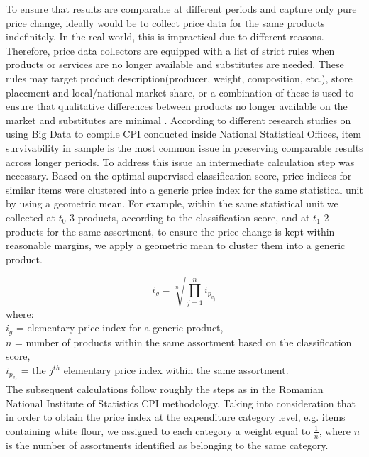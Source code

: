 \documentclass[]{article}
\begin{document}
To ensure that results are comparable at different periods and capture only pure price change, ideally would be to collect price data for the same products indefinitely\cite{cpi2}. In the real world, this is impractical due to different reasons. Therefore, price data collectors are equipped with a list of strict rules when products or services are no longer available and substitutes are needed. These rules may target product description(producer, weight, composition, etc.), store placement and local/national market share, or a combination of these is used to ensure that qualitative differences between products no longer available on the market and substitutes are minimal \cite{cpi}. According to different research studies on using Big Data to compile CPI conducted inside National Statistical Offices, item survivability in sample is the most common issue in preserving comparable results across longer periods\cite{ons2017, willenborg2017, tranzitivity, kints}. To address this issue an intermediate calculation step was necessary. Based on the optimal supervised classification score, price indices for similar items were clustered into a generic price index for the same statistical unit by using a geometric mean. For example, within the same statistical unit we collected at $t_{0}$ 3 products, according to the classification score, and at $t_{1}$ 2 products for the same assortment, to ensure the price change is kept within reasonable margins, we apply a geometric mean to cluster them into a generic product.   

\begin{equation}\label{eq:3}
i_{g} = \sqrt[n]{\prod_{j=1}^{n} i_{p_{v_{j}}}}
\end{equation}
where:\\
$i_{g}$ = elementary price index for a generic product, \\
$n$ = number of products within the same assortment based on the classification score, \\
$i_{p_{v_{j}}}$ = the $j^{th}$ elementary price index within the same assortment.\\


The subsequent calculations follow roughly the steps as in the Romanian National Institute of Statistics CPI methodology\cite{cpi}. Taking into consideration that in order to obtain the price index at the expenditure category level, e.g. items containing white flour, we assigned to each category a weight equal to $\frac{1}{n}$,
where $n$ is the number of assortments identified as belonging to the same category. 
\end{document}

